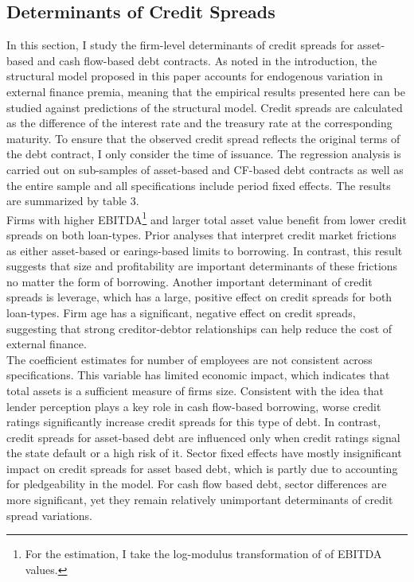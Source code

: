 \documentclass[12pt]{article}
\begin{document}
\subsection{Determinants of Credit Spreads \label{sec:credit spreads}} 
In this section, I study the firm-level determinants of credit spreads for asset-based and cash flow-based debt contracts. As noted in the introduction, the structural model proposed in this paper accounts for endogenous variation in external finance premia, meaning that the empirical results presented here can be studied against predictions of the structural model. Credit spreads are calculated as the difference of the interest rate and the treasury rate at the corresponding maturity. To ensure that the observed credit spread reflects the original terms of the debt contract, I only consider the time of issuance. The regression analysis is carried out on sub-samples of asset-based and CF-based debt contracts as well as the entire sample and all specifications include period fixed effects. The results are summarized by table 3. \vspace{3mm} \\
Firms with higher EBITDA\footnote{For the estimation, I take the log-modulus transformation of of EBITDA values.} and larger total asset value benefit from lower credit spreads on both loan-types. Prior analyses that interpret credit market frictions as either asset-based or earings-based limits to borrowing. In contrast, this result suggests that size and profitability are important determinants of these frictions no matter the form of borrowing. Another important determinant of credit spreads is leverage, which has a large, positive effect on credit spreads for both loan-types. Firm age has a significant, negative effect on credit spreads, suggesting that strong creditor-debtor relationships can help reduce the cost of external finance.  \vspace{3mm} \\
The coefficient estimates for number of employees are not consistent across specifications. This variable has limited economic impact, which indicates that total assets is a sufficient measure of firms size. Consistent with the idea that lender perception plays a key role in cash flow-based borrowing, worse credit ratings significantly increase credit spreads for this type of debt. In contrast, credit spreads for asset-based debt are influenced only when credit ratings signal the state default or a high risk of it. Sector fixed effects have mostly insignificant impact on credit spreads for asset based debt, which is partly due to accounting for pledgeability in the model. For cash flow based debt, sector differences are more significant, yet they remain relatively unimportant determinants of credit spread variations. \vspace{3mm} \\
\end{document}
